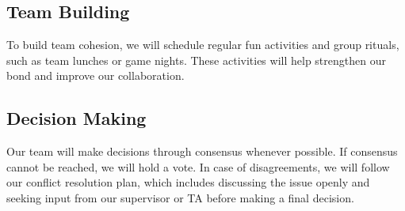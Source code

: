 \documentclass{article}
\begin{document}
\subsection*{Team Building}

To build team cohesion, we will schedule regular fun activities and group rituals, such as team lunches or game nights. These activities will help strengthen our bond and improve our collaboration.

\subsection*{Decision Making}

Our team will make decisions through consensus whenever possible. If consensus cannot be reached, we will hold a vote. In case of disagreements, we will follow our conflict resolution plan, which includes discussing the issue openly and seeking input from our supervisor or TA before making a final decision.
\end{document}
